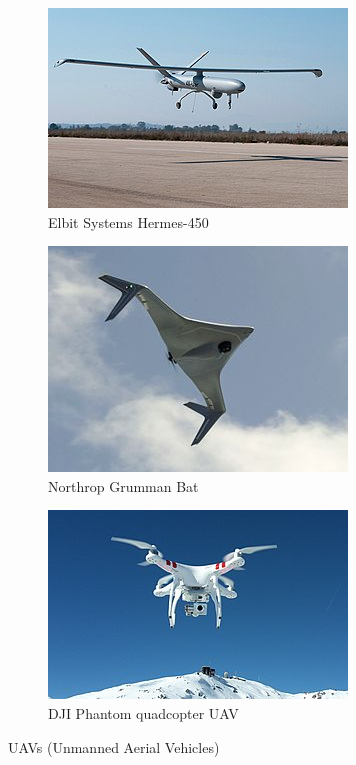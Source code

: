 \begin{figure}[htbp!]
    \centering
    \begin{subfigure}[b]{0.3\textwidth}
        \centering
        \includegraphics[height=0.15\textheight]{figs/U1.jpg}
        \caption{Elbit Systems Hermes-450}
    \end{subfigure}
    \begin{subfigure}[b]{0.3\textwidth}
        \centering
        \includegraphics[height=0.15\textheight]{figs/U2.jpg}
        \caption{Northrop Grumman Bat}
    \end{subfigure}
    \begin{subfigure}[b]{0.3\textwidth}
        \centering
        \includegraphics[height=0.15\textheight]{figs/U3.jpg}
        \caption{DJI Phantom quadcopter UAV}
    \end{subfigure}
    \caption{UAVs (Unmanned Aerial Vehicles)}
    \label{fig:UAVs}
\end{figure}

